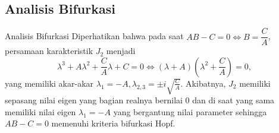 \documentclass[aspectratio=169]{beamer}
\begin{document}



\subsection{Analisis Bifurkasi}

\begin{frame}{Analisis Bifurkasi}
    Diperhatikan bahwa pada saat $AB - C = 0 \iff B = \dfrac{C}{A}$, persamaan karakteristik $J_2$ menjadi 
\begin{equation*}
    \lambda^3 + A\lambda^2 + \dfrac{C}{A}\lambda + C=0 \iff (\lambda + A)\left(\lambda^2 + \dfrac{C}{A}\right) = 0,
\end{equation*}
yang memiliki akar-akar $\lambda_1 = -A, \lambda_{2,3}=\pm i\sqrt{\frac{C}{A}}$. Akibatnya, $J_2$ memiliki sepasang nilai eigen yang bagian realnya bernilai $0$ dan di saat yang sama memiliki nilai eigen $\lambda_1 = - A$ yang bergantung nilai parameter sehingga $AB - C = 0$ memenuhi kriteria bifurkasi Hopf.  
\end{frame}
\end{document}
